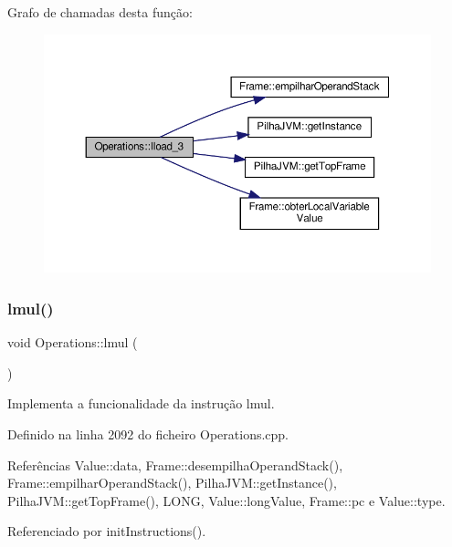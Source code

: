 Grafo de chamadas desta função\+:
\nopagebreak
\begin{figure}[H]
\begin{center}
\leavevmode
\includegraphics[width=350pt]{classOperations_af2f8b1e41b734f43e73d9d6811eb427b_cgraph}
\end{center}
\end{figure}
\mbox{\label{classOperations_ae23a8dfdcc02432b6f880334fa4a7c59}} 
\subsubsection{\texorpdfstring{lmul()}{lmul()}}
{\footnotesize\ttfamily void Operations\+::lmul (\begin{DoxyParamCaption}{ }\end{DoxyParamCaption})\hspace{0.3cm}{\ttfamily [private]}}



Implementa a funcionalidade da instrução lmul. 



Definido na linha 2092 do ficheiro Operations.\+cpp.



Referências Value\+::data, Frame\+::desempilha\+Operand\+Stack(), Frame\+::empilhar\+Operand\+Stack(), Pilha\+J\+V\+M\+::get\+Instance(), Pilha\+J\+V\+M\+::get\+Top\+Frame(), L\+O\+NG, Value\+::long\+Value, Frame\+::pc e Value\+::type.



Referenciado por init\+Instructions().

